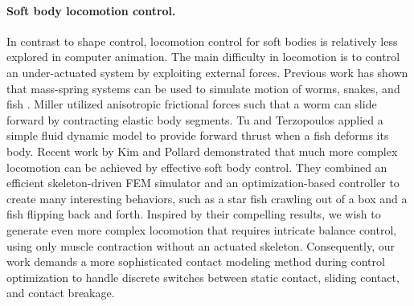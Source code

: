 \paragraph{Soft body locomotion control.} In contrast to shape control, locomotion control for soft bodies is
relatively less explored in computer animation. The main difficulty in
locomotion is to control an under-actuated system by exploiting
external forces. Previous work has shown that mass-spring systems can
be used to simulate motion of worms, snakes, and fish
\cite{Miller:1988,Tu:1994,Grzeszczuk:1995}. Miller
\cite{Miller:1988} utilized anisotropic frictional forces such
that a worm can slide forward by contracting elastic body segments. Tu
and Terzopoulos \cite{Tu:1994} applied a simple fluid dynamic
model to provide forward thrust when a fish deforms its body. Recent
work by Kim and Pollard \cite{Kim:2011:DCO,Kim:2011} demonstrated
that much more complex locomotion can be achieved by effective soft
body control. They combined an efficient skeleton-driven FEM simulator
and an optimization-based controller to create many interesting
behaviors, such as a star fish crawling out of a box and a fish
flipping back and forth. Inspired by their compelling results, we
wish to generate even more complex locomotion that requires intricate
balance control, using only muscle contraction without an actuated
skeleton. Consequently, our work demands a more sophisticated contact
modeling method during control optimization to handle discrete
switches between static contact, sliding contact, and contact
breakage.

